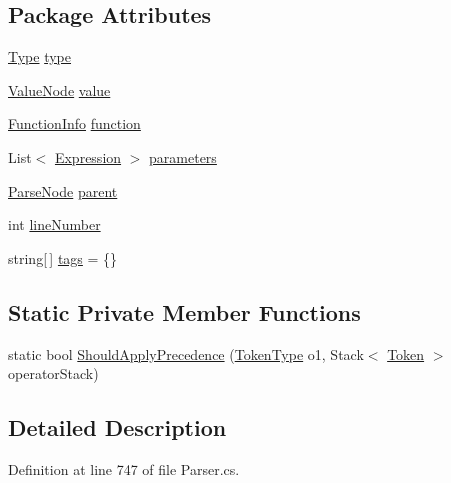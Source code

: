 \subsection*{Package Attributes}
\begin{DoxyCompactItemize}
\item 
\hyperlink{a00094_aceddb5496ccffe668bced2d131e4bf86}{Type} \hyperlink{a00094_ad55c92df835006328bc2a79a8f91efb9}{type}
\item 
\hyperlink{a00178}{Value\-Node} \hyperlink{a00094_a569e516782891544c334ff8131b23108}{value}
\item 
\hyperlink{a00096}{Function\-Info} \hyperlink{a00094_a9c1859ce5ad4c86ded8dd0d61da61320}{function}
\item 
List$<$ \hyperlink{a00094}{Expression} $>$ \hyperlink{a00094_a7b21380bead8ae08b2cfc6594edab32c}{parameters}
\item 
\hyperlink{a00138}{Parse\-Node} \hyperlink{a00138_af313a82103fcc2ff5a177dbb06b92f7b}{parent}
\item 
int \hyperlink{a00138_a18b493382de0fde5b4299c1bd2250075}{line\-Number}
\item 
string\mbox{[}$\,$\mbox{]} \hyperlink{a00138_a58b3a15788fd2d4127d73619dc6d04ae}{tags} = \{\}
\end{DoxyCompactItemize}
\subsection*{Static Private Member Functions}
\begin{DoxyCompactItemize}
\item 
static bool \hyperlink{a00094_a5004a8eaa00b2b55856ecb4f339033fb}{Should\-Apply\-Precedence} (\hyperlink{a00041_a301aa7c866593a5b625a8fc158bbeace}{Token\-Type} o1, Stack$<$ \hyperlink{a00163}{Token} $>$ operator\-Stack)
\end{DoxyCompactItemize}


\subsection{Detailed Description}


Definition at line 747 of file Parser.\-cs.




